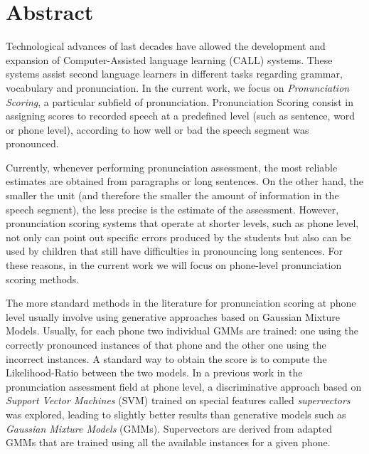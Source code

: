 \chapter*{Abstract}

\noindent
Technological advances of last decades have allowed the development and expansion
of Computer-Assisted language learning (CALL) systems. These systems assist
second language learners in different tasks regarding grammar, vocabulary and
pronunciation. In the current work, we focus on \textit{Pronunciation Scoring},
a particular subfield of pronunciation. Pronunciation Scoring consist in
assigning scores to recorded speech at a predefined
level (such as sentence, word or phone level), according to how well or bad
the speech segment was pronounced.

Currently, whenever performing pronunciation assessment, the most reliable estimates are
obtained from paragraphs or long sentences. On the other hand, the smaller the unit
(and therefore the smaller the amount of information in the speech segment),
the less precise is
the estimate of the assessment.
However, pronunciation scoring systems that operate at shorter levels, such
as phone level,
not only can point out specific errors produced by the students but also
can be used by children that still have difficulties in pronouncing long sentences.
For these reasons,
in the current work we will focus on phone-level pronunciation scoring methods.


The more standard methods in the literature for pronunciation scoring at
phone level usually involve using generative approaches
based on Gaussian Mixture Models.
Usually, for each phone two individual GMMs are trained: one using the correctly
pronounced instances of that phone and the other one using the incorrect instances.
A standard way to obtain the score is to compute the
Likelihood-Ratio between the two models.
In a previous work in the pronunciation assessment field at phone level, a discriminative
approach based on \textit{Support Vector Machines} (SVM) trained on special features
called \textit{supervectors} was explored, leading to slightly better results than
generative models such as \textit{Gaussian Mixture Models} (GMMs). Supervectors
are derived from adapted GMMs that are trained using all the available
instances for a given phone.

